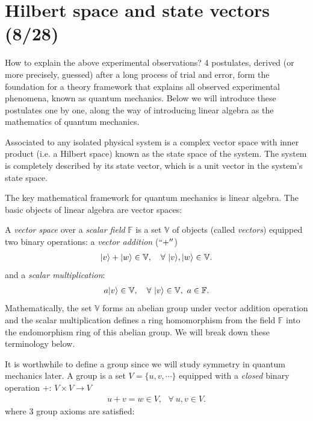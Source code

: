 \section{Hilbert space and state vectors (8/28)}


How to explain the above experimental observations? 4 postulates, derived (or more precisely, guessed) after a long process of trial and error, form the foundation for a theory framework that explains all observed experimental phenomena, known as quantum mechanics. Below we will introduce these postulates one by one, along the way of introducing linear algebra as the mathematics of quantum mechanics.

\begin{pos}\label{postulate 1}
    Associated to any isolated physical system is a complex vector space with inner product (i.e. a Hilbert space) known as the {state space} of the system. The system is completely described by its state vector, which is a unit vector in the system's state space.
\end{pos}

The key mathematical framework for quantum mechanics is linear algebra. The basic objects of linear algebra are vector spaces:

A \emph{vector space} over a \emph{scalar field} $\mathbb{F}$ is a set $\mathbb{V}$ of objects (called \emph{vectors}) equipped two binary operations: a \emph{vector addition} ($``+''$)
\begin{align}
|{v}\rangle+|{w}\rangle\in\mathbb{V},~~~\forall~|{v}\rangle,|{w}\rangle\in\mathbb{V}.
\end{align}
and a \emph{scalar multiplication}:
\begin{align}
a|{v}\rangle\in\mathbb{V},~~~\forall~|{v}\rangle\in\mathbb{V},~a\in\mathbb{F}.
\end{align}
Mathematically, the set $\mathbb{V}$ forms an abelian group under vector addition operation and the scalar multiplication defines a ring homomorphism from the field $\mathbb{F}$ into the endomorphism ring of this abelian group. We will break down these terminology below. 

It is worthwhile to define a group since we will study symmetry in quantum mechanics later. A group is a set $V=\{u,v,\cdots\}$ equipped with a \emph{closed} binary operation $+$: $V\times V\rightarrow V$
\begin{align}
u+v=w\in V,~~~\forall~u,v\in V.
\end{align}
where 3 group axioms are satisfied:

